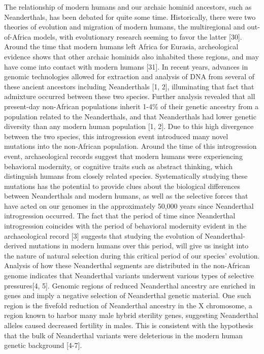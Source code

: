 The relationship of modern humans and our archaic hominid ancestors, such as Neanderthals, has been debated for quite some time. Historically, there were two theories of evolution and migration of modern humans, the multiregional and out-of-Africa models, with evolutionary research seeming to favor the latter [30].  Around the time that modern humans left Africa for Eurasia, archeological evidence shows that other archaic hominids also inhabited these regions, and may have come into contact with modern humans [31]. In recent years, advances in genomic technologies allowed for extraction and analysis of DNA from several of these ancient ancestors including Neanderthals [1, 2], illuminating that fact that admixture occurred between these two species. Further analysis revealed that all present-day non-African populations inherit 1-4\% of their genetic ancestry from a population related to the Neanderthals, and that Neanderthals had lower genetic diversity than any modern human population [1, 2].  Due to this high divergence between the two species, this introgression event introduced many novel mutations into the non-African population. Around the time of this introgression event, archaeological records suggest that modern humans were experiencing behavioral modernity, or cognitive traits such as abstract thinking, which distinguish humans from closely related species.
Systematically studying these mutations has the potential to provide clues about the biological differences between Neanderthals and modern humans, as well as the selective forces that have acted on our genomes in the approximately 50,000 years since Neanderthal introgression occurred. The fact that the period of time since Neanderthal introgression coincides with the period of behavioral modernity evident in the archaeological record [3] suggests that studying the evolution of Neanderthal-derived mutations in modern humans over this period, will give us insight into the nature of natural selection during this critical period of our species’ evolution. 
Analysis of how these Neanderthal segments are distributed in the non-African genome indicates that Neanderthal variants underwent various types of selective pressures[4, 5]. Genomic regions of reduced Neanderthal ancestry are enriched in genes and imply a negative selection of Neanderthal genetic material. One such region is the fivefold reduction of Neanderthal ancestry in the X chromosome, a region known to harbor many male hybrid sterility genes, suggesting Neanderthal alleles caused decreased fertility in males. This is consistent with the hypothesis that the bulk of Neanderthal variants were deleterious in the modern human genetic background [4-7]. 
